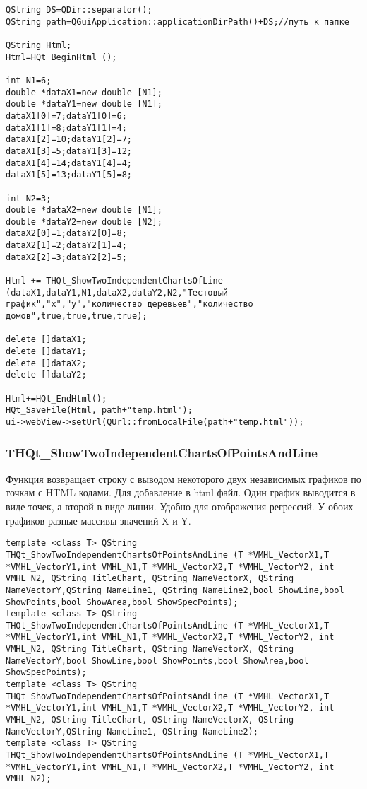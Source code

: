 \documentclass[a4paper,12pt]{article}
\begin{document}
\begin{lstlisting}[label=code_use_THQt_ShowTwoIndependentChartsOfLine,caption=Пример использования]
QString DS=QDir::separator();
QString path=QGuiApplication::applicationDirPath()+DS;//путь к папке

QString Html;
Html=HQt_BeginHtml ();

int N1=6;
double *dataX1=new double [N1];
double *dataY1=new double [N1];
dataX1[0]=7;dataY1[0]=6;
dataX1[1]=8;dataY1[1]=4;
dataX1[2]=10;dataY1[2]=7;
dataX1[3]=5;dataY1[3]=12;
dataX1[4]=14;dataY1[4]=4;
dataX1[5]=13;dataY1[5]=8;

int N2=3;
double *dataX2=new double [N1];
double *dataY2=new double [N2];
dataX2[0]=1;dataY2[0]=8;
dataX2[1]=2;dataY2[1]=4;
dataX2[2]=3;dataY2[2]=5;

Html += THQt_ShowTwoIndependentChartsOfLine (dataX1,dataY1,N1,dataX2,dataY2,N2,"Тестовый график","x","y","количество деревьев","количество домов",true,true,true,true);

delete []dataX1;
delete []dataY1;
delete []dataX2;
delete []dataY2;

Html+=HQt_EndHtml();
HQt_SaveFile(Html, path+"temp.html");
ui->webView->setUrl(QUrl::fromLocalFile(path+"temp.html"));
\end{lstlisting}

\subsubsection{THQt\_ShowTwoIndependentChartsOfPointsAndLine}\label{THQt_ShowTwoIndependentChartsOfPointsAndLine}

Функция возвращает строку с выводом некоторого двух независимых графиков по точкам с HTML кодами. Для добавление в html файл. Один график выводится в виде точек, а второй в виде линии. Удобно для отображения регрессий. У обоих графиков разные массивы значений X и Y.


\begin{lstlisting}[label=code_syntax_THQt_ShowTwoIndependentChartsOfPointsAndLine,caption=Синтаксис]
template <class T> QString THQt_ShowTwoIndependentChartsOfPointsAndLine (T *VMHL_VectorX1,T *VMHL_VectorY1,int VMHL_N1,T *VMHL_VectorX2,T *VMHL_VectorY2, int VMHL_N2, QString TitleChart, QString NameVectorX, QString NameVectorY,QString NameLine1, QString NameLine2,bool ShowLine,bool ShowPoints,bool ShowArea,bool ShowSpecPoints);
template <class T> QString THQt_ShowTwoIndependentChartsOfPointsAndLine (T *VMHL_VectorX1,T *VMHL_VectorY1,int VMHL_N1,T *VMHL_VectorX2,T *VMHL_VectorY2, int VMHL_N2, QString TitleChart, QString NameVectorX, QString NameVectorY,bool ShowLine,bool ShowPoints,bool ShowArea,bool ShowSpecPoints);
template <class T> QString THQt_ShowTwoIndependentChartsOfPointsAndLine (T *VMHL_VectorX1,T *VMHL_VectorY1,int VMHL_N1,T *VMHL_VectorX2,T *VMHL_VectorY2, int VMHL_N2, QString TitleChart, QString NameVectorX, QString NameVectorY,QString NameLine1, QString NameLine2);
template <class T> QString THQt_ShowTwoIndependentChartsOfPointsAndLine (T *VMHL_VectorX1,T *VMHL_VectorY1,int VMHL_N1,T *VMHL_VectorX2,T *VMHL_VectorY2, int VMHL_N2);
\end{lstlisting}
\end{document}
